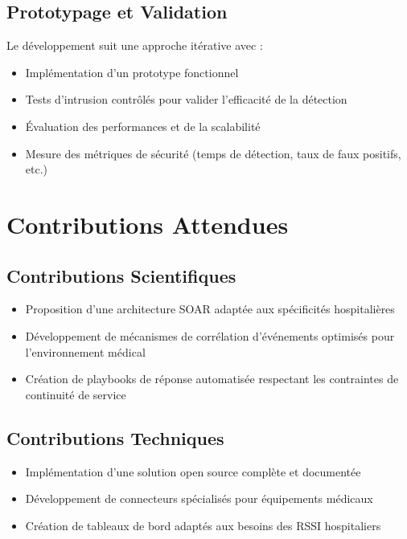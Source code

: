\subsection{Prototypage et Validation}

Le développement suit une approche itérative avec :
\begin{itemize}
    \item Implémentation d'un prototype fonctionnel
    \item Tests d'intrusion contrôlés pour valider l'efficacité de la détection
    \item Évaluation des performances et de la scalabilité
    \item Mesure des métriques de sécurité (temps de détection, taux de faux positifs, etc.)
\end{itemize}

\section{Contributions Attendues}

\subsection{Contributions Scientifiques}

\begin{itemize}
    \item Proposition d'une architecture SOAR adaptée aux spécificités hospitalières
    \item Développement de mécanismes de corrélation d'événements optimisés pour l'environnement médical
    \item Création de playbooks de réponse automatisée respectant les contraintes de continuité de service
\end{itemize}

\subsection{Contributions Techniques}

\begin{itemize}
    \item Implémentation d'une solution open source complète et documentée
    \item Développement de connecteurs spécialisés pour équipements médicaux
    \item Création de tableaux de bord adaptés aux besoins des RSSI hospitaliers
\end{itemize}

